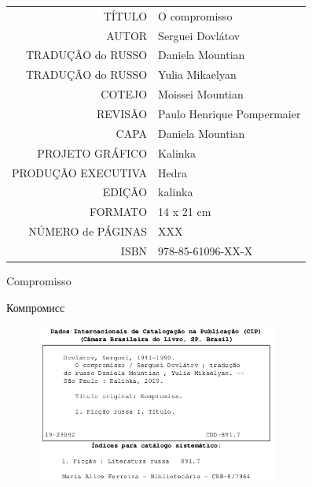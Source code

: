\begin{vplace}[1]
\begin{table}[ht!]
\MyriadPro
\scriptsize
\begin{tabular}{rl}
TÍTULO            & O compromisso 									   \\[2pt]
AUTOR             & Serguei Dovlátov                          		   \\[2pt]
TRADUÇÃO do RUSSO & Daniela Mountian                                   \\[2pt]
TRADUÇÃO do RUSSO & Yulia Mikaelyan 	 			                   \\[2pt]
COTEJO            & Moissei Mountian 							       \\[2pt]
REVISÃO           & Paulo Henrique Pompermaier                         \\[2pt]
CAPA              & Daniela Mountian                                   \\[2pt]
PROJETO GRÁFICO   & Kalinka                                            \\[2pt]
PRODUÇÃO EXECUTIVA & Hedra                                             \\[2pt]
EDIÇÃO            & kalinka 		                                   \\[2pt] 
FORMATO           & 14 x 21 cm                                         \\[2pt]
NÚMERO de PÁGINAS & XXX                                                \\[2pt]
ISBN              & 978-85-61096-XX-X                                 
\end{tabular}
\end{table}
\end{vplace}

\newpage
\MyriadPro
\begin{center}
\small
Compromisso

Компромисс
\end{center}

\scriptsize


\begin{figure}[!ht]
\centering

  \includegraphics[width=80mm]{./imgs/ficha.jpg}
 \end{figure}


